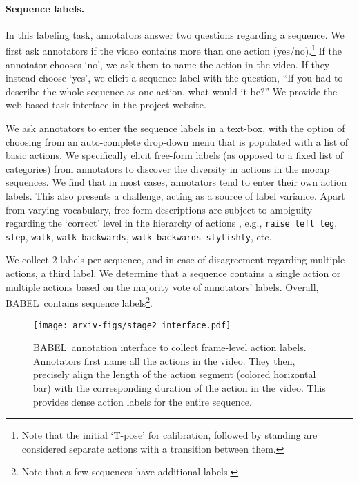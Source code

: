 \documentclass[final]{cvpr}
\def\babel{BABEL}
\begin{document}
\noindent
\paragraph{Sequence labels.}
In this labeling task, annotators answer two questions regarding a sequence. 
We first ask annotators if the video contains more than one action (yes/no).\footnote{Note that the initial `T-pose' for calibration, followed by standing are considered separate actions with a transition between them.} 
If the annotator chooses `no', we ask them to name the action in the video. 
If they instead choose `yes', we elicit a sequence label with the question, ``If you had to describe the whole sequence as one action, what would it be?'' 
We provide the web-based task interface in the project website. 

We ask annotators to enter the sequence labels in a text-box, with the option of choosing from an auto-complete drop-down menu that is populated with a list of basic actions. 
We specifically elicit free-form labels (as opposed to a fixed list of categories) from annotators to discover the diversity in actions in the mocap sequences. 
We find that in most cases, annotators tend to enter their own action labels. 
This also presents a challenge, acting as a source of label variance. Apart from varying vocabulary, free-form descriptions are subject to ambiguity regarding the `correct' level in the hierarchy of actions \cite{DBLP:conf/cvpr/GuSRVPLVTRSSM18}, e.g., \texttt{raise left leg}, \texttt{step}, \texttt{walk}, \texttt{walk backwards}, \texttt{walk backwards stylishly}, etc. 

We collect 2 labels per sequence, and in case of disagreement regarding multiple actions, a third label. 
We determine that a sequence contains a single action or multiple actions based on the majority vote of annotators' labels. 
Overall, \babel~contains  sequence labels\footnote{Note that a few sequences have additional labels.}. 

\begin{figure}[t!]
    \centering
    \texttt{[image: arxiv-figs/stage2\_interface.pdf]}
    \caption{
        \babel~annotation interface to collect frame-level action labels. 
        Annotators first name all the actions in the video. 
        They then, precisely align the length of the action segment (colored horizontal bar) with the corresponding duration of the action in the video. 
        This provides dense action labels for the entire sequence. 
    }
    \label{fig:stage2_interface}
\end{figure}
 
\end{document}
